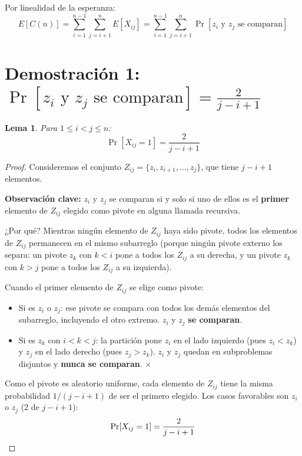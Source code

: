 \documentclass[11pt, letterpaper]{article}
\theoremstyle{definition}
\theoremstyle{plain}
\newtheorem{lemma}[theorem]{Lema}
\theoremstyle{remark}
\begin{document}
Por linealidad de la esperanza:
\[
  E[C(n)] = \sum_{i=1}^{n-1} \sum_{j=i+1}^{n} E[X_{ij}]
          = \sum_{i=1}^{n-1} \sum_{j=i+1}^{n}
            \Pr[z_i \text{ y } z_j \text{ se comparan}]
\]

\section{Demostración 1:
  \texorpdfstring{$\Pr[z_i \text{ y } z_j \text{ se comparan}]
  = \frac{2}{j-i+1}$}{Pr[zi y zj se comparan] = 2/(j-i+1)}}

\begin{lemma}\label{lem:prob}
Para $1 \leq i < j \leq n$:
\[
  \Pr[X_{ij} = 1] = \frac{2}{j - i + 1}
\]
\end{lemma}

\begin{proof}
Consideremos el conjunto
$Z_{ij} = \{z_i, z_{i+1}, \ldots, z_j\}$, que tiene $j - i + 1$
elementos.

\textbf{Observación clave:} $z_i$ y $z_j$ se comparan si y solo si
uno de ellos es el \textbf{primer} elemento de $Z_{ij}$ elegido como
pivote en alguna llamada recursiva.

¿Por qué? Mientras ningún elemento de $Z_{ij}$ haya sido pivote,
todos los elementos de $Z_{ij}$ permanecen en el mismo subarreglo
(porque ningún pivote externo los separa: un pivote $z_k$ con $k < i$
pone a todos los $Z_{ij}$ a su derecha, y un pivote $z_k$ con $k > j$
pone a todos los $Z_{ij}$ a su izquierda).

Cuando el primer elemento de $Z_{ij}$ se elige como pivote:
\begin{itemize}
  \item Si es $z_i$ o $z_j$: ese pivote se compara con todos los demás
    elementos del subarreglo, incluyendo el otro extremo. $z_i$ y
    $z_j$ \textbf{se comparan}. \checkmark
  \item Si es $z_k$ con $i < k < j$: la partición pone $z_i$ en el
    lado izquierdo (pues $z_i < z_k$) y $z_j$ en el lado derecho
    (pues $z_j > z_k$). $z_i$ y $z_j$ quedan en subproblemas
    disjuntos y \textbf{nunca se comparan}. $\times$
\end{itemize}

Como el pivote es aleatorio uniforme, cada elemento de $Z_{ij}$ tiene
la misma probabilidad $1/(j - i + 1)$ de ser el primero elegido. Los
casos favorables son $z_i$ o $z_j$ (2 de $j - i + 1$):
\[
  \Pr[X_{ij} = 1] = \frac{2}{j - i + 1} \qedhere
\]
\end{proof}
\end{document}
